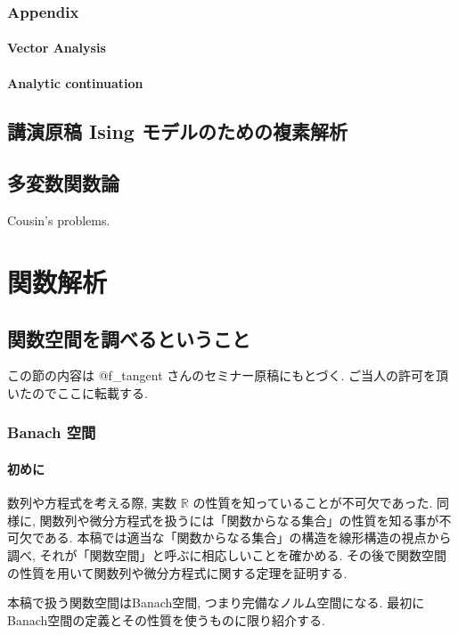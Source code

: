 \documentclass[openany, a4paper, oneside]{jsbook}
\theoremstyle{break}
\theoremstyle{breakdefn}
\begin{document}
\section{Appendix}

\subsection{Vector Analysis}

\subsection{Analytic continuation}

\chapter{講演原稿 Ising モデルのための複素解析}

\chapter{多変数関数論}


Cousin's problems.
\part{関数解析}

\chapter{関数空間を調べるということ}


この節の内容は @f\_tangent さんのセミナー原稿にもとづく.
ご当人の許可を頂いたのでここに転載する.
\section{Banach 空間}

\subsection{初めに}


数列や方程式を考える際, 実数 $\mathbb{R}$ の性質を知っていることが不可欠であった.
同様に, 関数列や微分方程式を扱うには「関数からなる集合」の性質を知る事が不可欠である.
本稿では適当な「関数からなる集合」の構造を線形構造の視点から調べ, それが「関数空間」と呼ぶに相応しいことを確かめる.
その後で関数空間の性質を用いて関数列や微分方程式に関する定理を証明する.

本稿で扱う関数空間はBanach空間, つまり完備なノルム空間になる.
最初にBanach空間の定義とその性質を使うものに限り紹介する.
\end{document}
